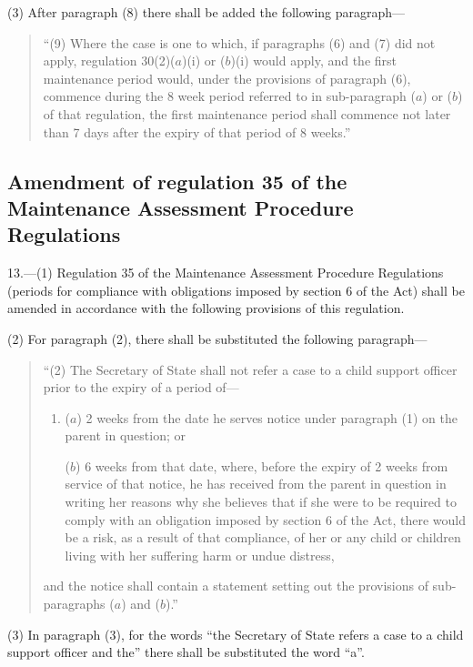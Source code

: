 \documentclass[12pt,a4paper]{article}
\begin{document}
(3) After paragraph (8) there shall be added the following paragraph—
\begin{quotation}
“(9) Where the case is one to which, if paragraphs (6) and (7) did not apply, regulation 30(2)($a$)(i) or ($b$)(i) would apply, and the first maintenance period would, under the provisions of paragraph (6), commence during the 8 week period referred to in sub-paragraph ($a$) or ($b$) of that regulation, the first maintenance period shall commence not later than 7 days after the expiry of that period of 8 weeks.”
\end{quotation}

\subsection[13. Amendment of regulation 35 of the Maintenance Assessment Procedure Regulations]{Amendment of regulation 35 of the Maintenance Assessment Procedure Regulations}

13.—(1) Regulation 35 of the Maintenance Assessment Procedure Regulations (periods for compliance with obligations imposed by section 6 of the Act) shall be amended in accordance with the following provisions of this regulation.

(2) For paragraph (2), there shall be substituted the following paragraph—
\begin{quotation}
“(2) The Secretary of State shall not refer a case to a child support officer prior to the expiry of a period of—
\begin{enumerate}\item[]
($a$) 2 weeks from the date he serves notice under paragraph (1) on the parent in question; or

($b$) 6 weeks from that date, where, before the expiry of 2 weeks from service of that notice, he has received from the parent in question in writing her reasons why she believes that if she were to be required to comply with an obligation imposed by section 6 of the Act, there would be a risk, as a result of that compliance, of her or any child or children living with her suffering harm or undue distress,
\end{enumerate}
and the notice shall contain a statement setting out the provisions of sub-paragraphs ($a$) and ($b$).”
\end{quotation}

(3) In paragraph (3), for the words “the Secretary of State refers a case to a child support officer and the” there shall be substituted the word “a”.
\end{document}

